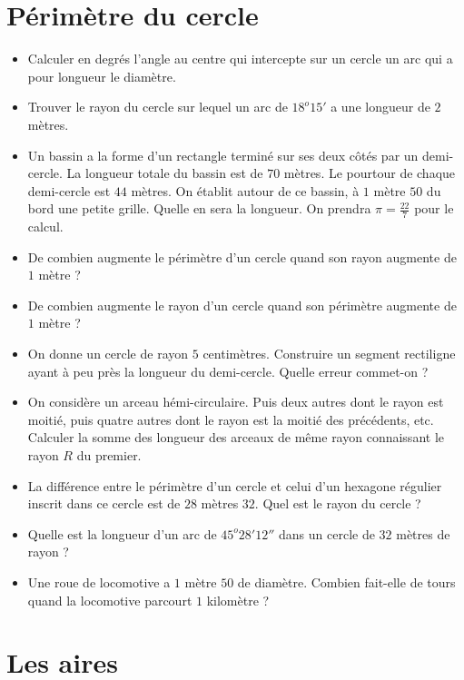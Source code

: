 \documentclass[12 pt]{report}
\theoremstyle{plain}
\newcounter{n}
\renewcommand{\it}{\item[$\mathbf{\then}.$]\stepcounter{n} }
\begin{document}
\chapter{Périmètre du cercle} 
 \begin{itemize}
 \it Calculer en degrés l'angle au centre qui intercepte sur un cercle un arc qui a pour longueur le diamètre.
 \it Trouver le rayon du cercle sur lequel un arc de $18^o15'$ a une longueur de $2$ mètres. 
 \it Un bassin a la forme d'un rectangle terminé sur ses deux côtés 
 par un demi-cercle. La longueur totale du bassin est de $70$ mètres. Le pourtour de chaque demi-cercle est $44$ mètres. On établit autour 
 de ce bassin, à $1$ mètre $50$ du bord une petite grille. Quelle en sera la longueur. On prendra $\pi = \frac{22}7$ pour le calcul.
 \it De combien augmente le périmètre d'un cercle quand son rayon augmente de $1$ mètre ? 
 \it De combien augmente le rayon d'un cercle quand son périmètre augmente de $1$ mètre ? 
 \it On donne un cercle de rayon $5$ centimètres. Construire un segment rectiligne ayant à peu près la longueur du demi-cercle. Quelle erreur commet-on ? 
 \it On considère un arceau hémi-circulaire. Puis deux autres dont le rayon est moitié, puis quatre autres dont le rayon est la moitié des précédents, etc. Calculer la somme des longueur des arceaux de même rayon connaissant le rayon $R$ du premier.
 \it La différence entre le périmètre d'un cercle et celui d'un hexagone régulier inscrit dans ce cercle est de $28$ mètres $32$. Quel est le rayon du cercle ? 
 \it Quelle est la longueur d'un arc de $45^o28'12''$ dans un cercle de
 $32$ mètres de rayon ? 
 \it Une roue de locomotive a $1$ mètre $50$ de diamètre. Combien fait-elle de tours quand la locomotive parcourt $1$ kilomètre ? 
 \end{itemize}
\chapter{Les aires}
\end{document}
